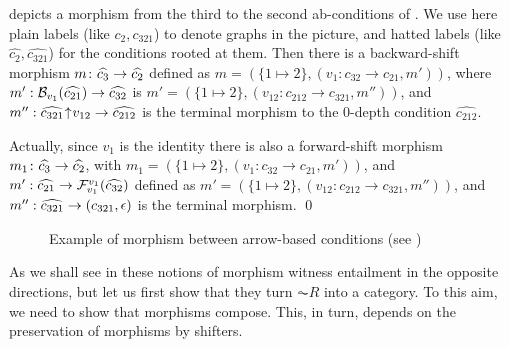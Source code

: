 \begin{example}
 depicts a morphism from the third to the second ab-conditions of . We use here plain labels (like $c_2, c_{321}$) to denote graphs in the picture, and hatted labels (like $\widehat{c_2}, \widehat{c_{321}}$) for the conditions rooted at them. 
Then  there is a backward-shift morphism $m\colon \widehat{c_3}\rightarrow \widehat{c_2}$ defined as $m = (\{1\mapsto 2\}, (v_1: c_{32} \to c_{21}, m'))$, where $m':\mathcal{B}_{v_1}(\widehat{c_{21}}) \rightarrow \widehat{c_{32}}$ is 
$m' = (\{1\mapsto 2\},(v_{12}: c_{212} \to c_{321}, m''))$, and $m'':{\widehat{c_{321}}}{\mskip1mu\uparrow\mskip1mu}{v_{12}} \rightarrow \widehat{c_{212}}$ is the terminal morphism to the 0-depth condition $\widehat{c_{212}}$. 

Actually, since $v_1$ is the identity there is also a forward-shift morphism 
$m_1\colon \widehat{c_3}\rightarrow \widehat{c_2}$, with $m_1 = (\{1\mapsto 2\}, (v_1: c_{32} \to c_{21}, m'))$, and 
$m':\widehat{c_{21}} \rightarrow \mathcal{F}_{v_1}^{v_1}(\widehat{c_{32}})$ defined as 
$m' = (\{1\mapsto 2\},(v_{12}: c_{212} \to c_{321}, m''))$, and $m'':\widehat{c_{321}} \rightarrow (c_{321},\epsilon)$ is the terminal morphism. 
\qed
\end{example}

\begin{figure}[t]
\centering

\caption{Example of morphism between arrow-based conditions (see )}
\end{figure}



As we shall see in  these notions of morphism witness entailment in the opposite directions, but let us first show that they turn $\AC{R}$ into a category. To this aim,  we need to show that morphisms compose. This, in turn, depends on the preservation of morphisms by shifters.
 
